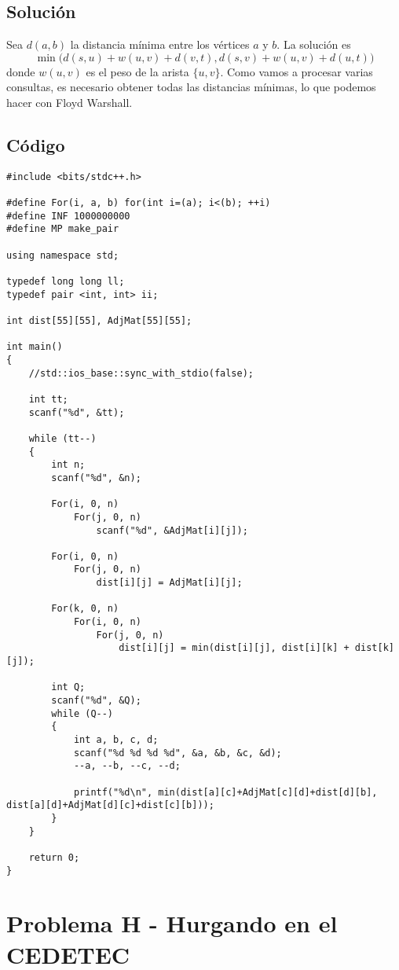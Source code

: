 \subsection*{Solución}
Sea $d(a, b)$ la distancia mínima entre los vértices $a$ y $b$. La solución es \[ \min\big(d(s,u) + w(u,v) + d(v,t), d(s,v) + w(u, v) + d(u, t)\big) \]
donde $w(u, v)$ es el peso de la arista $\{u, v\}$. Como vamos a procesar varias consultas, es necesario obtener todas las distancias mínimas, lo que podemos hacer con Floyd Warshall.

\subsection*{Código}
\begin{verbatim}
#include <bits/stdc++.h>
 
#define For(i, a, b) for(int i=(a); i<(b); ++i)
#define INF 1000000000
#define MP make_pair
 
using namespace std;
 
typedef long long ll;
typedef pair <int, int> ii;
 
int dist[55][55], AdjMat[55][55];
 
int main()
{
    //std::ios_base::sync_with_stdio(false);
 
    int tt;
    scanf("%d", &tt);
 
    while (tt--)
    {
        int n;
        scanf("%d", &n);
 
        For(i, 0, n)
            For(j, 0, n)
                scanf("%d", &AdjMat[i][j]);
 
        For(i, 0, n)
            For(j, 0, n)
                dist[i][j] = AdjMat[i][j];
 
        For(k, 0, n)
            For(i, 0, n)
                For(j, 0, n)
                    dist[i][j] = min(dist[i][j], dist[i][k] + dist[k][j]);
 
        int Q;
        scanf("%d", &Q);
        while (Q--)
        {
            int a, b, c, d;
            scanf("%d %d %d %d", &a, &b, &c, &d);
            --a, --b, --c, --d;
 
            printf("%d\n", min(dist[a][c]+AdjMat[c][d]+dist[d][b], dist[a][d]+AdjMat[d][c]+dist[c][b]));
        }
    }
 
    return 0;
}
\end{verbatim}

\section{Problema H - Hurgando en el CEDETEC}

